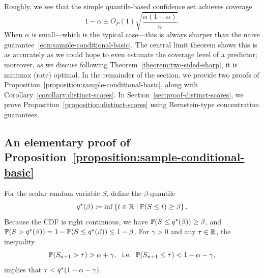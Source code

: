 \documentclass[11pt]{article}
\newcommand{\scorerv}{S}
\begin{document}
Roughly, we see that the simple quantile-based confidence set achieves
coverage
\begin{equation*}
  1 - \alpha \pm O_P(1) \sqrt{\frac{\alpha(1 - \alpha)}{n}}.
\end{equation*}
When $\alpha$ is small---which is the typical case---this is
always sharper than the naive guarantee~\eqref{eqn:sample-conditional-basic}.
%
The central limit theorem shows this is as accurately as we could hope to
even estimate the coverage level of a predictor; moreover, as we discuss
following Theorem~\ref{theorem:two-sided-sharp}, it is minimax
(rate) optimal.
%
In the remainder of the section, we provide two proofs
of Proposition~\ref{proposition:sample-conditional-basic},
along with Corollary~\ref{corollary:distinct-scores}.
%
In Section~\ref{sec:proof-distinct-scores}, we prove
Proposition~\ref{proposition:distinct-scores} using
Bernstein-type concentration guarantees.


\subsection{An elementary proof of
  Proposition~\ref{proposition:sample-conditional-basic}}

For the scalar random variable $\scorerv$, define the $\beta$-quantile
\begin{equation}
  \label{eqn:actual-quantile-mapping}
  q\opt(\beta) \defeq \inf \left\{t \in \R
  \mid \P(\scorerv \le t) \ge \beta \right\}.
\end{equation}
Because the CDF is right continuous, we have $\mathbb{P}(S \le q^\star(\beta)) \ge
\beta$, and $\mathbb{P}(S > q^\star(\beta)) = 1 - \mathbb{P}(S \le q^\star(\beta)) \le 1 -
\beta$.
%
For $\gamma > 0$ and any $\tau \in \mathbb{R}$, the inequality
\begin{equation*}
  \P(\scorerv_{n + 1} > \tau) > \alpha + \gamma,
  ~~ \mbox{i.e.} ~~
  \P(\scorerv_{n + 1} \le \tau) < 1 - \alpha - \gamma,
\end{equation*}
implies that $\tau < q^\star(1 - \alpha - \gamma)$.
\end{document}
